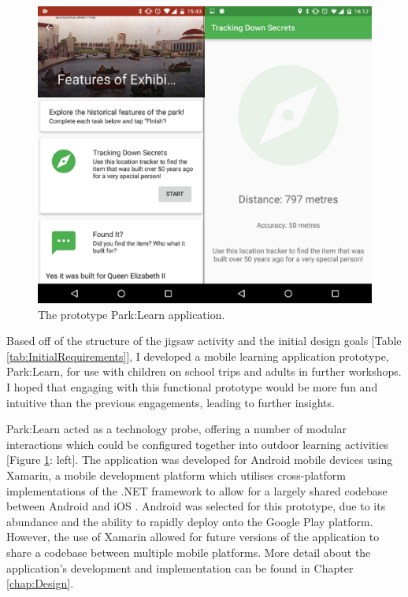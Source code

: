 \begin{figure}
  \centering
  \includegraphics[width=0.8\columnwidth]{images/chapter04/parklearnprototype.png}
  \caption{The prototype Park:Learn application.}
  \label{fig:parklearnPrototype}
\end{figure}

Based off of the structure of the jigsaw activity and the initial design goals [Table \ref{tab:InitialRequirements}], I developed a mobile learning application prototype, Park:Learn, for use with children on school trips and adults in further workshops. I hoped that engaging with this functional prototype would be more fun and intuitive than the previous engagements, leading to further insights.

Park:Learn acted as a technology probe, offering a number of modular interactions which could be configured together into outdoor learning activities [Figure \ref{fig:parklearnPrototype}: left]. The application was developed for Android mobile devices using Xamarin, a mobile development platform which utilises cross-platform implementations of the .NET framework to allow for a largely shared codebase between Android and iOS \citep{Xamarin2016}. Android was selected for this prototype, due to its abundance and the ability to rapidly deploy onto the Google Play platform. However, the use of Xamarin allowed for future versions of the application to share a codebase between multiple mobile platforms. More detail about the application's development and implementation can be found in Chapter \ref{chap:Design}.

